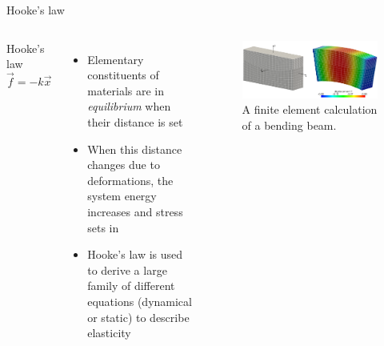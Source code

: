 
\begin{frame}{Hooke's law}
	\begin{columns}[T,onlytextwidth]
		Hooke's law
		$$
		\vec{f} = -k \vec{x}
		$$
		\begin{itemize}
			\item Elementary constituents of materials are in \emph{equilibrium} when their distance is set
			\item When this distance changes due to deformations, the system energy increases and stress sets in
			\item Hooke's law is used to derive a large family of different equations (dynamical or static) to describe elasticity
		\end{itemize}
		
		\vspace{4em}
		\begin{figure}
			\centering
			\includegraphics[width=0.9\linewidth]{bending_beam.png}
			\caption{A finite element calculation of a bending beam.}
		\end{figure}
	\end{columns}
\end{frame}



